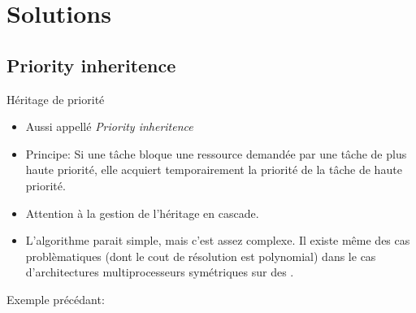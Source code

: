\section{Solutions}

\subsection{Priority inheritence}

\begin{frame}{Héritage de priorité}
  \begin{itemize} 
  \item Aussi appellé \emph{Priority inheritence}
  \item Principe: Si  une tâche bloque une ressource  demandée par une
    tâche  de plus  haute  priorité, elle  acquiert temporairement  la
    priorité de la tâche de haute priorité.
  \item Attention à la gestion de l'héritage en cascade.
  \item  L'algorithme parait  simple,  mais c'est  assez complexe.  Il
    existe même des cas problèmatiques (dont le cout de résolution est
    polynomial)   dans   le   cas   d'architectures   multiprocesseurs
    symétriques sur des .
  \end{itemize} 
  Exemple précédant:
  \begin{center}
  \end{center}
\end{frame} 

